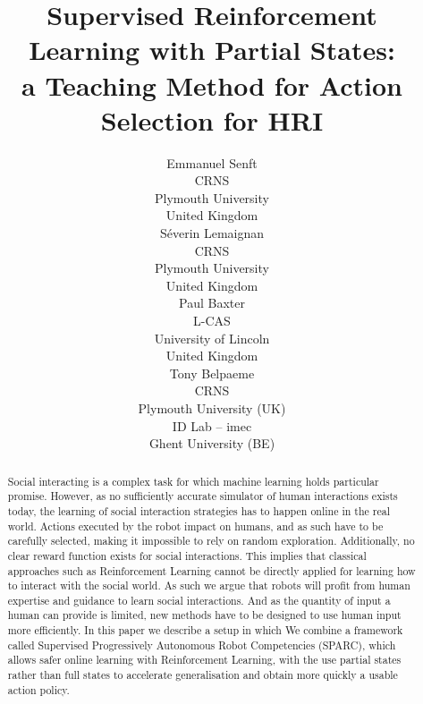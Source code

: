 \documentclass[letterpaper]{article} %
\begin{document}
%
\title{Supervised Reinforcement Learning with Partial States: \\
 a Teaching Method for Action Selection for HRI}

\author{Emmanuel Senft \\
CRNS \\
Plymouth University \\
United Kingdom\\
\And S\'{e}verin Lemaignan\\
CRNS \\
Plymouth University \\
United Kingdom\\
\And Paul Baxter\\
L-CAS\\
University of Lincoln\\
United Kingdom\\
 \And Tony Belpaeme\\
 CRNS\\ Plymouth University (UK) \\ ID Lab -- imec \\ Ghent University (BE)}

\maketitle
\begin{abstract}
    Social interacting is a complex task for which machine learning holds particular promise. However, as no sufficiently
    accurate simulator of human interactions exists today, the learning of social interaction strategies has to happen online in the real
    world. Actions executed by the robot impact on humans, and as such
    have to be carefully selected, making it impossible to rely on random exploration. Additionally, no clear reward function exists for
    social interactions. This implies that classical approaches such as
    Reinforcement Learning cannot be directly applied for learning how to
    interact with the social world. As such we argue that
    robots will profit from human expertise and guidance to learn social
    interactions. And as the quantity of input a human can provide is limited,
    new methods have to be designed to use human input more efficiently. In this paper we describe a setup in which We
    combine a framework called Supervised Progressively Autonomous Robot Competencies (SPARC), which
    allows safer online learning with Reinforcement Learning, with the use
    partial states rather than full states to accelerate generalisation and
    obtain more quickly a usable action policy.
\end{abstract}
\end{document}
